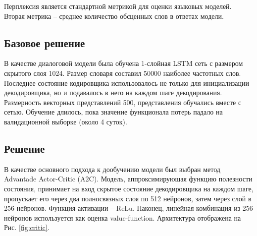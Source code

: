 \documentclass[12pt,a4paper]{amsart}
\begin{document}
Перплексия является стандартной метрикой для оценки языковых моделей. Вторая метрика -- среднее количество обсценных слов в ответах модели.

\subsection{Базовое решение}

В качестве диалоговой модели была обучена 1-слойная LSTM сеть с размером скрытого слоя 1024. Размер словаря составил 50000 наиболее частотных слов. Последнее состояние кодировщика использовалось не только для инициализации декодировщика, но и подавалось в него на каждом шаге декодирования. Размерность векторных представлений 500, представления обучались вместе с сетью. Обучение длилось, пока значение функционала потерь падало на валидационной выборке (около 4 суток).

\subsection{Решение}

В качестве основного подхода к дообучению модели был выбран метод Advantade Actor-Critic (A2C). Модель, аппроксимирующая функцию полезности состояния, принимает на вход скрытое состояние декодировщика на каждом шаге, пропускает его через два полносвязных слоя по 512 нейронов, затем через слой в 256 нейронов. Функция активации -- ReLu. Наконец, линейная комбинация из 256 нейронов используется как оценка value-function. Архитектура отображена на Рис. \ref{fig:critic}.
\end{document}
